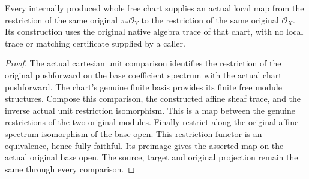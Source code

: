 \begin{lemma}
\label{lem:kn-structure-trace-original-local-map}
\leanok
Every internally produced whole free chart supplies an actual local map
from the restriction of the same original $\pi_*\mathcal O_Y$ to the
restriction of the same original $\mathcal O_X$. Its construction uses
the original native algebra trace of that chart, with no local trace or
matching certificate supplied by a caller.
\end{lemma}
\begin{proof}
The actual cartesian unit comparison identifies the restriction of the
original pushforward on the base coefficient spectrum with the actual
chart pushforward. The chart's genuine finite basis provides its finite
free module structures. Compose this comparison, the constructed affine
sheaf trace, and the inverse actual unit restriction isomorphism. This
is a map between the genuine restrictions of the two original modules.
Finally restrict along the original affine-spectrum isomorphism of the
base open. This restriction functor is an equivalence, hence fully
faithful. Its preimage gives the asserted map on the actual original
base open. The source, target and original projection remain the same
through every comparison.
\end{proof}
